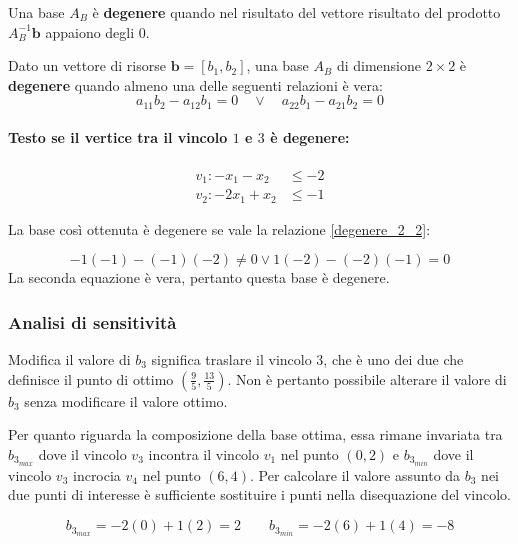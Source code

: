 \documentclass[\main/main.tex]{subfiles}
\begin{document}
\begin{definition}
  Una base $A_B$ è \textbf{degenere} quando nel risultato del vettore risultato del prodotto $A_B^{-1} \bm{b}$ appaiono degli 0.
\end{definition}

\begin{definition} \label{degenere_2_2}
  Dato un vettore di risorse $\bm{b} = [b_1, b_2]$, una base $A_B$ di dimensione  $2 \times 2$ è \textbf{degenere} quando almeno una delle seguenti relazioni è vera:
  \[
    a_{11}b_2 - a_{12}b_1 = 0 \quad \lor \quad a_{22}b_1 - a_{21}b_2 = 0
  \]
\end{definition}

\paragraph*{Testo se il vertice tra il vincolo $1$ e $3$ è degenere:}

\begin{align*}
  v_1: -x_1 -x_2  & \leq -2 \\
  v_2: -2x_1 +x_2 & \leq -1
\end{align*}

La base così ottenuta è degenere se vale la relazione \ref{degenere_2_2}:

\[
  -1(-1) - (-1)(-2) \neq 0 \lor 1(-2) - (-2)(-1) = 0
\]
La seconda equazione è vera, pertanto questa base è degenere.

\subsubsection*{Analisi di sensitività}
Modifica il valore di $b_3$ significa traslare il vincolo $3$, che è uno dei due che definisce il punto di ottimo $(\frac{9}{5}, \frac{13}{5})$. Non è pertanto possibile alterare il valore di $b_3$ senza modificare il valore ottimo.

Per quanto riguarda la composizione della base ottima, essa rimane invariata tra $b_{3_{max}}$ dove il vincolo $v_3$ incontra il vincolo $v_1$ nel punto $(0,2)$ e $b_{3_{min}}$ dove il vincolo $v_3$ incrocia $v_4$ nel punto $(6,4)$. Per calcolare il valore assunto da $b_3$ nei due punti di interesse è sufficiente sostituire i punti nella disequazione del vincolo.

\[
  b_{3_{max}} = -2(0) + 1(2) = 2 \qquad b_{3_{min}} = -2(6) + 1(4) = -8
\]
\end{document}
